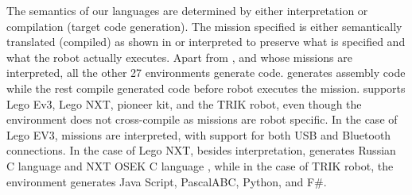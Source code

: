  The semantics of our languages are determined by either interpretation or compilation (target code generation). The mission specified is either semantically translated (compiled) as shown in  or interpreted to preserve what is specified and what the robot actually executes. Apart from \lego, and \codelab whose missions are interpreted, all the other 27 environments generate code. \metabot generates assembly code while the rest compile generated code before robot executes the mission.  \trik supports Lego Ev3, Lego NXT, pioneer kit, and the TRIK robot, even though the environment does not cross-compile as missions are robot specific. In the case of Lego EV3, missions are interpreted, with support for both USB and Bluetooth connections.
In the case of Lego NXT, besides interpretation, \trik generates Russian C language and NXT OSEK C language , while in the case of TRIK robot, the environment generates Java Script, PascalABC, Python, and F\#.%






